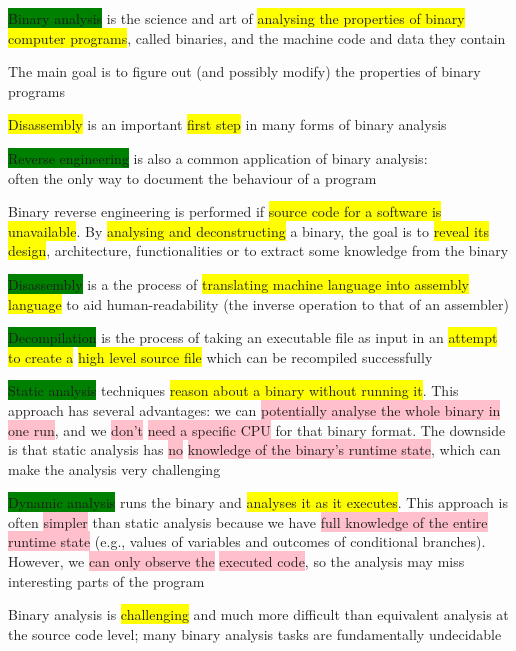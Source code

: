 \documentclass[]{project_plan}
\begin{document}
\colorbox{green}{Binary analysis} is the science and art of \colorbox{yellow}{analysing the properties of binary
  computer programs}, called binaries, and the machine code and data they contain

The main goal is to figure out (and possibly modify) the properties of binary programs

\colorbox{yellow}{Disassembly} is an important \colorbox{yellow}{first step} in many forms of binary analysis

\colorbox{green}{Reverse engineering} is also a common application of binary analysis:\\
often the only way to document the behaviour of a program

Binary reverse engineering is performed if \colorbox{yellow}{source code for a software is unavailable}. By
\colorbox{yellow}{analysing and deconstructing} a binary, the goal is to \colorbox{yellow}{reveal its design}, architecture,
functionalities or to extract some knowledge from the binary

\colorbox{green}{Disassembly} is a the process of \colorbox{yellow}{translating machine language into assembly language} to
aid human-readability (the inverse operation to that of an assembler)

\colorbox{green}{Decompilation} is the process of taking an executable file as input in an \colorbox{yellow}{attempt to create a}
\colorbox{yellow}{high level source file} which can be recompiled successfully

\colorbox{green}{Static analysis} techniques \colorbox{yellow}{reason about a binary without running it}. This approach has several
advantages: we can \colorbox{pink}{potentially analyse the whole binary in one run}, and we \colorbox{pink}{don’t} \colorbox{pink}{need a
  specific CPU} for that binary format. The downside is that static analysis has \colorbox{pink}{no} \colorbox{pink}{knowledge of
  the binary’s runtime state}, which can make the analysis very challenging

\colorbox{green}{Dynamic analysis} runs the binary and \colorbox{yellow}{analyses it as it executes}. This approach is often \colorbox{pink}{simpler}
than static analysis because we have \colorbox{pink}{full knowledge of the entire runtime state} (e.g., values of
variables and outcomes of conditional branches). However, we \colorbox{pink}{can only observe the} \colorbox{pink}{executed
  code}, so the analysis may miss interesting parts of the program

Binary analysis is \colorbox{yellow}{challenging} and much more difficult than equivalent analysis
at the source code level; many binary analysis tasks are fundamentally undecidable
\end{document}
